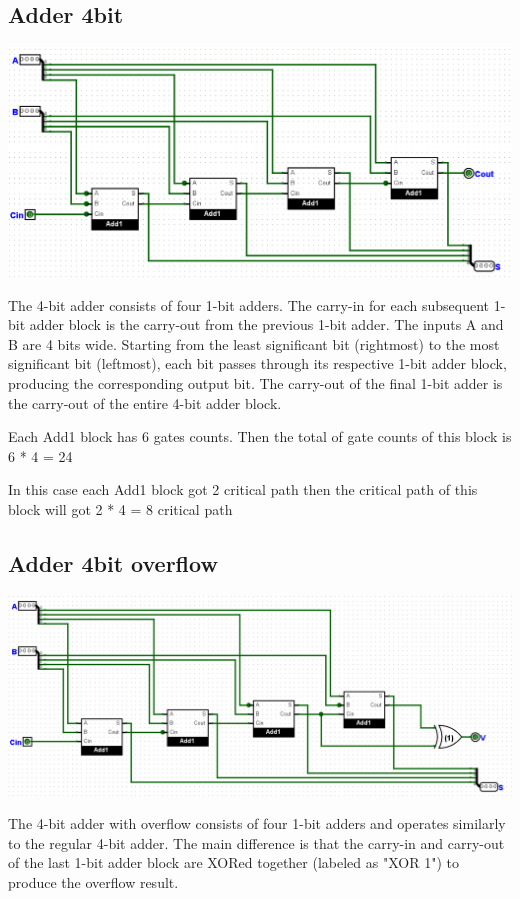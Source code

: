 \documentclass{article}
\begin{document}
\subsection{Adder 4bit}
\begin{center}
    \includegraphics[width=1\textwidth]{images/Add4.png}
\end{center}
\hspace*{2em}The 4-bit adder consists of four 1-bit adders. The carry-in for each subsequent 1-bit adder block is the carry-out from the previous 1-bit adder. The inputs A and B are 4 bits wide. Starting from the least significant bit (rightmost) to the most significant bit (leftmost), each bit passes through its respective 1-bit adder block, producing the corresponding output bit. The carry-out of the final 1-bit adder is the carry-out of the entire 4-bit adder block.

\hspace*{2em}Each Add1 block has 6 gates counts. Then the total of gate counts of this block is 6 * 4 = 24

\hspace{2em}In this case each Add1 block got 2 critical path then the critical path of this block will got 2 * 4 = 8 critical path

\subsection{Adder 4bit overflow}
\begin{center}
    \includegraphics[width=1\textwidth]{images/Add4V.png}
\end{center}
\hspace*{2em}The 4-bit adder with overflow consists of four 1-bit adders and operates similarly to the regular 4-bit adder. The main difference is that the carry-in and carry-out of the last 1-bit adder block are XORed together (labeled as "XOR 1") to produce the overflow result.
\end{document}

